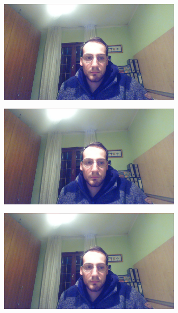 \documentclass[paper=a4, fontsize=10pt]{scrartcl}	%
\begin{document}
	\begin{figure}[H]
	\centering
	\begin{subfigure}{0.2\textwidth}
		\includegraphics[width=\linewidth]{images/heatmap/img_gaus/img_man_g3.jpg}
	\end{subfigure}%
	\begin{subfigure}{0.2\textwidth}
		\includegraphics[width=\linewidth]{images/heatmap/img_gaus/img_man_g4.jpg}
	\end{subfigure}%
	\begin{subfigure}{0.2\textwidth}
		\includegraphics[width=\linewidth]{images/heatmap/img_gaus/img_man_g5.jpg}

\end{subfigure}
\end{figure}
\end{document}
